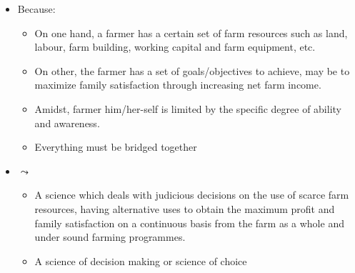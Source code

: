 \documentclass[12pt,ignorenonframetext,aspectratio=169]{beamer}
\providecommand{\tightlist}{%
  \setlength{\itemsep}{0pt}\setlength{\parskip}{0pt}}
\begin{document}
\begin{frame}{}
\protect\hypertarget{section}{}

\begin{itemize}
\tightlist
\item
  Because:

  \begin{itemize}
  \tightlist
  \item
    On one hand, a farmer has a certain set of farm resources such as
    land, labour, farm building, working capital and farm equipment,
    etc.
  \item
    On other, the farmer has a set of goals/objectives to achieve, may
    be to maximize family satisfaction through increasing net farm
    income.
  \item
    Amidst, farmer him/her-self is limited by the specific degree of
    ability and awareness.
  \item
    Everything must be bridged together
  \end{itemize}
\item
  \(\leadsto\)

  \begin{itemize}
  \tightlist
  \item
    A science which deals with judicious decisions on the use of scarce
    farm resources, having alternative uses to obtain the maximum profit
    and family satisfaction on a continuous basis from the farm as a
    whole and under sound farming programmes.
  \item
    A science of decision making or science of choice
  \end{itemize}
\end{itemize}

\end{frame}
\end{document}
